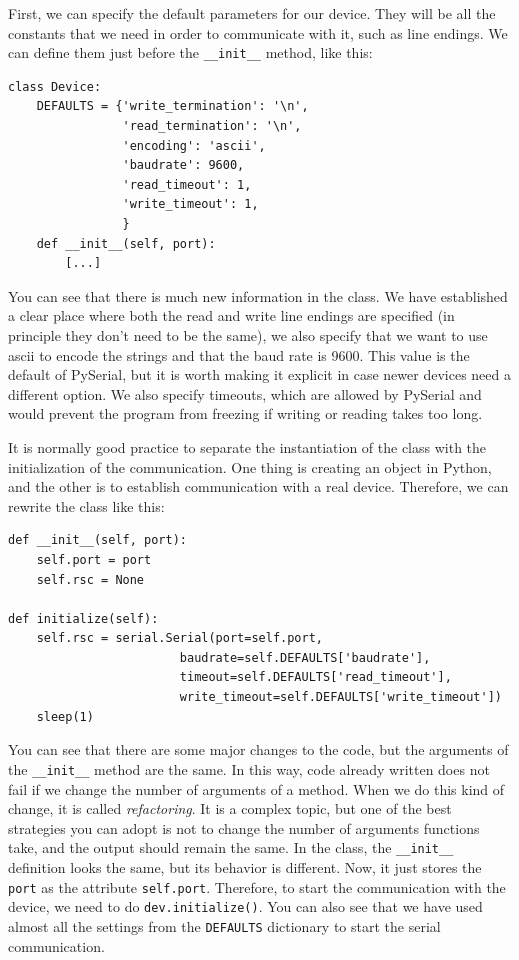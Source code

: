 First, we can specify the default parameters for our device. They will be all the constants that we need in order to communicate with it, such as line endings. We can define them just before the \texttt{__init__} method, like this:

\begin{verbatim}
class Device:
    DEFAULTS = {'write_termination': '\n',
                'read_termination': '\n',
                'encoding': 'ascii',
                'baudrate': 9600,
                'read_timeout': 1,
                'write_timeout': 1,
                }
    def __init__(self, port):
        [...]
\end{verbatim}

You can see that there is much new information in the class. We have established a clear place where both the read and write line endings are specified (in principle they don't need to be the same), we also specify that we want to use ascii to encode the strings and that the baud rate is 9600. This value is the default of PySerial, but it is worth making it explicit in case newer devices need a different option. We also specify timeouts, which are allowed by PySerial and would prevent the program from freezing if writing or reading takes too long.

It is normally good practice to separate the instantiation of the class with the initialization of the communication. One thing is creating an object in Python, and the other is to establish communication with a real device. Therefore, we can rewrite the class like this:

\begin{verbatim}
def __init__(self, port):
    self.port = port
    self.rsc = None

def initialize(self):
    self.rsc = serial.Serial(port=self.port,
                        baudrate=self.DEFAULTS['baudrate'],
                        timeout=self.DEFAULTS['read_timeout'],
                        write_timeout=self.DEFAULTS['write_timeout'])
    sleep(1)
\end{verbatim}

You can see that there are some major changes to the code, but the arguments of the \texttt{__init__} method are the same. In this way, code already written does not fail if we change the number of arguments of a method. When we do this kind of change, it is called \emph{refactoring}. It is a complex topic, but one of the best strategies you can adopt is not to change the number of arguments functions take, and the output should remain the same. In the class, the \texttt{__init__} definition looks the same, but its behavior is different. Now, it just stores the \texttt{port} as the attribute \texttt{self.port}. Therefore, to start the communication with the device, we need to do \texttt{dev.initialize()}. You can also see that we have used almost all the settings from the \texttt{DEFAULTS} dictionary to start the serial communication.

